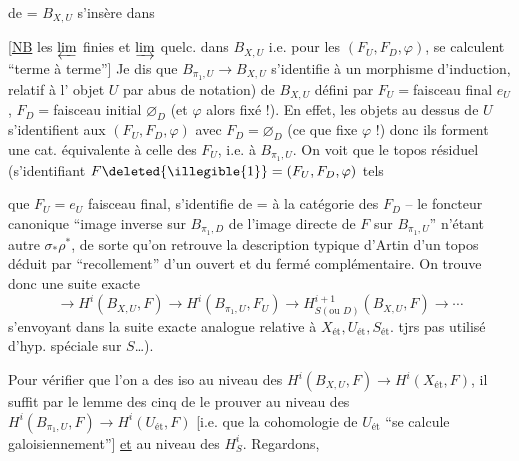 de = $B_{X,U}$ s'insère dans

[\uline{NB} les $\varprojlim$ finies et $\varinjlim$ quelc.
dans $B_{X,U}$ i.e. pour les $(F_U,F_D,\varphi)$, se
calculent ``terme à terme''] Je dis
que $B_{\pi_1,U}\longrightarrow B_{X,U}$ s'identifie à un
morphisme d'induction, relatif à l'
objet   $U$ par abus de notation)
de $B_{X,U}$ défini par
$F_U={}$faisceau final $e_U$, $F_D={}$faisceau initial $\varnothing_D$
(et $\varphi$  alors fixé !). En effet, les
objets  au dessus de $U$ s'identifient aux
$(F_U,F_D,\varphi)$ avec $F_D=\varnothing_D$ (ce que fixe $\varphi$ !) donc
ils forment une cat. équivalente à celle des
$F_U$, i.e. à $B_{\pi_1,U}$. On voit que le topos
résiduel (s'identifiant   $F\deleted{\illegible{1}}=(F_U,F_D,\varphi)$ tels

que $F_U=e_U$ faisceau final, s'identifie de = à la
catégorie  des $F_D$  -- le foncteur
canonique ``image inverse sur $B_{\pi_1,D}$ de l'image
directe de $F$ sur $B_{\pi_1,U}$'' n'étant autre
$\sigma_*\rho^*$, de sorte qu'on retrouve la description
 typique d'Artin d'un topos déduit
par ``recollement'' d'un  ouvert et du
fermé complémentaire.
On trouve donc une suite exacte
\[
\longrightarrow H^i(B_{X,U},F)\longrightarrow
H^i(B_{\pi_1,U},F_U)\longrightarrow
H^{i+1}_{S(\text{ou }D)}(B_{X,U},F)\longrightarrow\cdots
\]
s'envoyant dans la suite exacte analogue
relative à $X_{\mathrm{ét}},U_{\mathrm{ét}},S_{\mathrm{ét}}$.  
tjrs pas utilisé d'hyp. spéciale sur $S$\ldots).

Pour vérifier que l'on a des iso
au niveau des $H^i(B_{X,U},F)\longrightarrow H^i(X_{\mathrm{ét}},F)$,
il suffit par le lemme des cinq de
le prouver au niveau des
$H^i(B_{\pi_1,U},F)\longrightarrow H^i(U_{\mathrm{ét}},F)$ [i.e.  que la
cohomologie de $U_{\mathrm{ét}}$ ``se calcule galoisiennement'']
\uline{et} au niveau des $H^i_S$.  Regardons,

